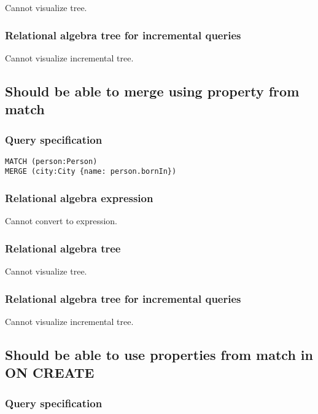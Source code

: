 Cannot visualize tree.

\subsubsection*{Relational algebra tree for incremental queries}

Cannot visualize incremental tree.

\subsection{Should be able to merge using property from match}

\subsubsection*{Query specification}

\begin{lstlisting}
MATCH (person:Person)
MERGE (city:City {name: person.bornIn})
\end{lstlisting}

\subsubsection*{Relational algebra expression}

Cannot convert to expression.

\subsubsection*{Relational algebra tree}

Cannot visualize tree.

\subsubsection*{Relational algebra tree for incremental queries}

Cannot visualize incremental tree.

\subsection{Should be able to use properties from match in ON CREATE}

\subsubsection*{Query specification}

